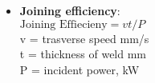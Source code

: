 \documentclass{article}
\begin{document}
\begin{itemize}
			\item \textbf{Joining efficiency}:\\
				$\text{Joining Effiecieny} = vt/P$\\
				v = trasverse speed mm/s\\
				t = thickness of weld mm\\
				P = incident power, kW\\

		\end{itemize}
	
\end{document}

